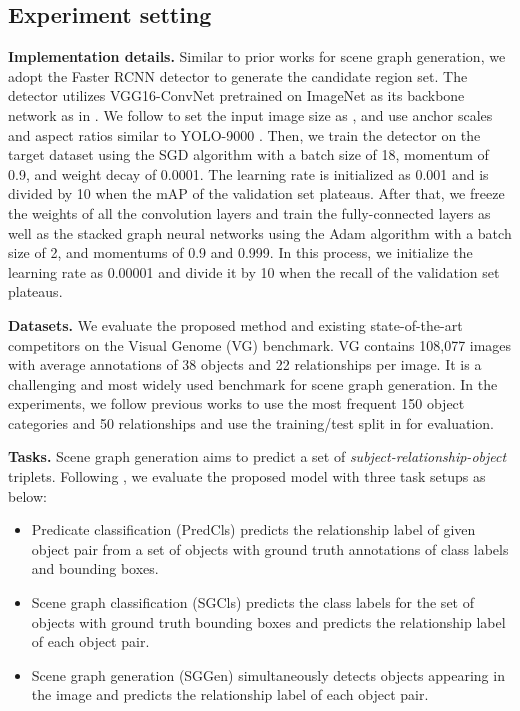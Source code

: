 \documentclass[10pt,twocolumn,letterpaper]{article}
\begin{document}
\subsection{Experiment setting}

\noindent\textbf{Implementation details. }Similar to prior works \cite{xu2017scene,zellers2017neural} for scene graph generation, we adopt the Faster RCNN detector \cite{ren2015faster} to generate the candidate region set. The detector utilizes VGG16-ConvNet \cite{simonyan2015very} pretrained on ImageNet \cite{russakovsky2015imagenet} as its backbone network as in \cite{xu2017scene,zellers2017neural}. We follow \cite{zellers2017neural} to set the input image size as , and use anchor scales and aspect ratios similar to YOLO-9000 \cite{redmon2017yolo9000}. Then, we train the detector on the target dataset using the SGD algorithm with a batch size of 18, momentum of 0.9, and weight decay of 0.0001. The learning rate is initialized as 0.001 and is divided by 10 when the mAP of the validation set plateaus. After that, we freeze the weights of all the convolution layers and train the fully-connected layers as well as the stacked graph neural networks using the Adam algorithm with a batch size of 2, and momentums of 0.9 and 0.999. In this process, we initialize the learning rate as 0.00001 and divide it by 10 when the recall of the validation set plateaus.


\noindent\textbf{Datasets. }We evaluate the proposed method and existing state-of-the-art competitors on the Visual Genome (VG) \cite{krishna2017visual} benchmark. VG contains 108,077 images with average annotations of 38 objects and 22 relationships per image. It is a challenging and most widely used benchmark for scene graph generation. In the experiments, we follow previous works \cite{zellers2017neural,xu2017scene} to use the most frequent 150 object categories and 50 relationships and use the training/test split in \cite{xu2017scene} for evaluation.

\noindent\textbf{Tasks. }Scene graph generation aims to predict a set of \emph{subject-relationship-object} triplets. Following \cite{xu2017scene}, we evaluate the proposed model with three task setups as below: 

\begin{itemize}
  \item Predicate classification (PredCls) predicts the relationship label of given object pair from a set of objects with ground truth annotations of class labels and bounding boxes.  
  \item Scene graph classification (SGCls) predicts the class labels for the set of objects with ground truth bounding boxes and predicts the relationship label of each object pair. 
  \item Scene graph generation (SGGen) simultaneously detects objects appearing in the image and predicts the relationship label of each object pair.
\end{itemize}
\end{document}
